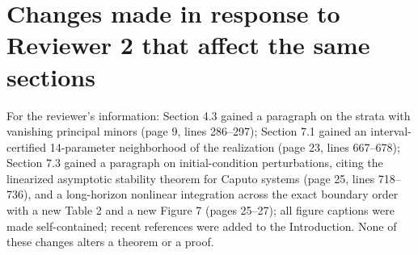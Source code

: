 \section*{Changes made in response to Reviewer 2 that affect the same sections}
For the reviewer's information: Section 4.3 gained a paragraph on the strata with vanishing principal minors (page 9, lines 286--297); Section 7.1 gained an interval-certified 14-parameter neighborhood of the realization (page 23, lines 667--678); Section 7.3 gained a paragraph on initial-condition perturbations, citing the linearized asymptotic stability theorem for Caputo systems (page 25, lines 718--736), and a long-horizon nonlinear integration across the exact boundary order with a new Table 2 and a new Figure 7 (pages 25--27); all figure captions were made self-contained; recent references were added to the Introduction. None of these changes alters a theorem or a proof.

